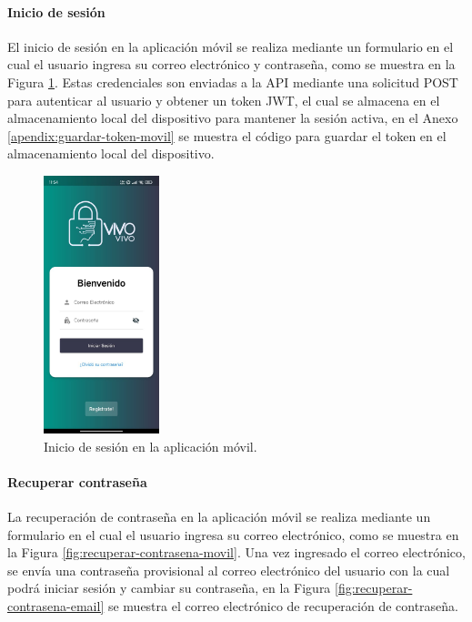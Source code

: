 \paragraph{Inicio de sesión}
El inicio de sesión en la aplicación móvil se realiza mediante un formulario en el cual el usuario ingresa su correo electrónico y
contraseña, como se muestra en la Figura \ref{fig:inicio-sesion-movil}. Estas credenciales son enviadas a la API mediante una solicitud
POST para autenticar al usuario y obtener un token JWT, el cual se almacena en el almacenamiento local del dispositivo para mantener
la sesión activa, en el Anexo \ref{apendix:guardar-token-movil} se muestra el código para guardar el token en el almacenamiento local del
dispositivo.

\begin{figure}[H]
    \centering
    \includegraphics[width=0.3\textwidth]{chapters/III-resultados-y-discusion/resources/images/inicio-sesion-movil.png}
    \caption{Inicio de sesión en la aplicación móvil.}
    \label{fig:inicio-sesion-movil}
\end{figure}

\paragraph{Recuperar contraseña}
La recuperación de contraseña en la aplicación móvil se realiza mediante un formulario en el cual el usuario ingresa su correo electrónico,
como se muestra en la Figura \ref{fig:recuperar-contrasena-movil}. Una vez ingresado el correo electrónico, se envía una contraseña provisional
al correo electrónico del usuario con la cual podrá iniciar sesión y cambiar su contraseña, en la Figura \ref{fig:recuperar-contrasena-email}
se muestra el correo electrónico de recuperación de contraseña.

